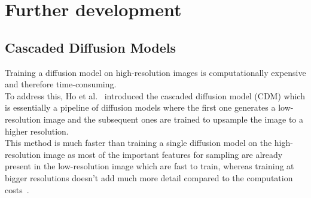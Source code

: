 \documentclass[twoside]{article}
\numberwithin{equation}{section}
\numberwithin{figure}{section}
\begin{document}
\section{Further development}
\subsection{Cascaded Diffusion Models}
Training a diffusion model on high-resolution images is computationally expensive and therefore time-consuming. \\
To address this, Ho et al.~\cite{ho2021cascaded} introduced the cascaded diffusion model (CDM) which is essentially a pipeline of diffusion models where the first one generates a low-resolution image and the subsequent ones are trained to upsample the image to a higher resolution. \\
This method is much faster than training a single diffusion model on the high-resolution image as most of the important features for sampling are already present in the low-resolution image which are fast to train, whereas training at bigger resolutions doesn't add much more detail compared to the computation costs~\cite{ho2021cascaded}.
\end{document}
